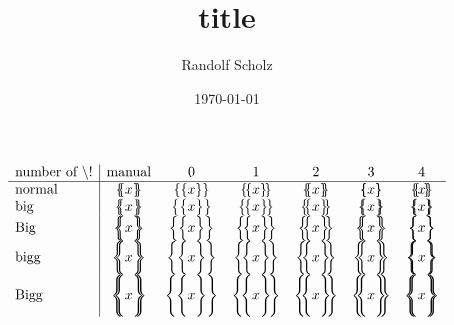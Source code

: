 \documentclass[a4paper,11pt,reqno]{scrartcl}
\date{\today}
\author{Randolf Scholz}
\title{title}
\begin{document}
\maketitle

$$
\begin{array}{l|cccccc}
\text{number of \textbackslash!} &\text{manual} & 0 & 1 & 2 & 3 & 4\\ \hline
\text{normal} &      \lbrace\mkern-6.25mu     \lbrace x      \rbrace\mkern-6.25mu     \rbrace &       \lbrace    \lbrace x      \rbrace     \rbrace  &      \lbrace\!     \lbrace x      \rbrace\!     \rbrace &      \lbrace\!\!     \lbrace x      \rbrace\!\!     \rbrace &      \lbrace\!\!\!     \lbrace x      \rbrace\!\!\!     \rbrace &      \lbrace\!\!\!\!     \lbrace x      \rbrace\!\!\!\!     \rbrace \\
\text{big}    & \big \lbrace\mkern-8mu   \big \lbrace x \big \rbrace\mkern-8mu   \big \rbrace & \big \lbrace\big \lbrace x \big \rbrace\big \rbrace  & \big \lbrace\!\big \lbrace x \big \rbrace\!\big \rbrace & \big \lbrace\!\!\big \lbrace x \big \rbrace\!\!\big \rbrace & \big \lbrace\!\!\!\big \lbrace x  \big\rbrace\!\!\!\big \rbrace & \big \lbrace\!\!\!\!\big \lbrace x \big \rbrace\!\!\!\!\big \rbrace \\
\text{Big}    & \Big \lbrace\mkern-9.5mu \Big \lbrace x \Big \rbrace\mkern-9.5mu \Big \rbrace & \Big \lbrace\Big \lbrace x \Big \rbrace\Big \rbrace  & \Big \lbrace\!\Big \lbrace x \Big \rbrace\!\Big \rbrace & \Big \lbrace\!\!\Big \lbrace x \Big \rbrace\!\!\Big \rbrace & \Big \lbrace\!\!\!\Big \lbrace x  \Big\rbrace\!\!\!\Big \rbrace & \Big \lbrace\!\!\!\!\Big \lbrace x \Big \rbrace\!\!\!\!\Big \rbrace \\
\text{bigg}   & \bigg\lbrace\mkern-10.5mu\bigg\lbrace x \bigg\rbrace\mkern-10.5mu\bigg\rbrace & \bigg\lbrace\bigg\lbrace x \bigg\rbrace\bigg\rbrace  & \bigg\lbrace\!\bigg\lbrace x \bigg\rbrace\!\bigg\rbrace & \bigg\lbrace\!\!\bigg\lbrace x \bigg\rbrace\!\!\bigg\rbrace & \bigg\lbrace\!\!\!\bigg\lbrace x \bigg\rbrace\!\!\!\bigg\rbrace & \bigg\lbrace\!\!\!\!\bigg\lbrace x \bigg\rbrace\!\!\!\!\bigg\rbrace \\
\text{Bigg}   & \Bigg\lbrace\mkern-11.5mu\Bigg\lbrace x \Bigg\rbrace\mkern-11.5mu\Bigg\rbrace & \Bigg\lbrace\Bigg\lbrace x \Bigg\rbrace\Bigg\rbrace  & \Bigg\lbrace\!\Bigg\lbrace x \Bigg\rbrace\!\Bigg\rbrace & \Bigg\lbrace\!\!\Bigg\lbrace x \Bigg\rbrace\!\!\Bigg\rbrace & \Bigg\lbrace\!\!\!\Bigg\lbrace x \Bigg\rbrace\!\!\!\Bigg\rbrace & \Bigg\lbrace\!\!\!\!\Bigg\lbrace x \Bigg\rbrace\!\!\!\!\Bigg\rbrace \\
\end{array}
$$
\end{document}
